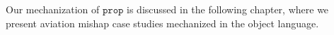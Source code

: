 Our mechanization of $\mathtt{prop}$ is discussed in the following chapter, where we present aviation mishap case studies mechanized in the object language.
%
%
%
